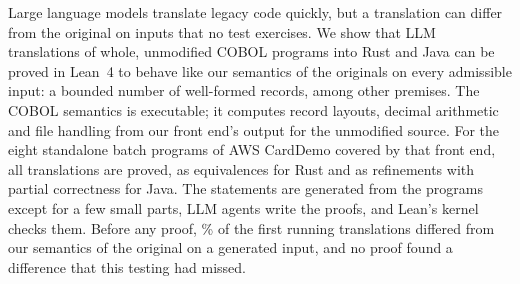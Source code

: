 Large language models translate legacy code quickly, but a translation can differ from the original on inputs that no
test exercises. We show that LLM translations of whole, unmodified COBOL programs into Rust and Java can be proved in
Lean~4 to behave like our semantics of the originals on every admissible input: a bounded number of well-formed
records, among other premises. The COBOL semantics is executable; it computes record layouts, decimal arithmetic and
file handling from our front end's output for the unmodified source. For the eight standalone batch programs of AWS
CardDemo covered by that front end, all \aTheorems{} translations are proved, as equivalences for Rust and as
refinements with partial correctness for Java. The statements are generated from the programs except for a few small
parts, LLM agents write the proofs, and Lean's kernel checks them. Before any proof, \aaFirstDiffPct\% of the first
running translations differed from our semantics of the original on a generated input, and no proof found a difference
that this testing had missed.
